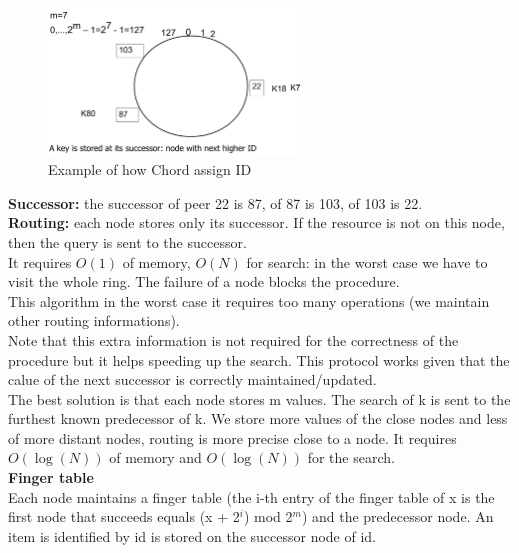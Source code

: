 \documentclass[paper=a4, fontsize=11pt]{scrartcl} %
\numberwithin{equation}{section} %
\numberwithin{figure}{section} %
\numberwithin{table}{section} %
\begin{document}
 \begin{figure}[H]
  \centering
  \includegraphics[width=0.6\textwidth]{img/chord_ex.png}
  \caption{Example of how Chord assign ID}
  \label{fig:boat1}
\end{figure}
\textbf{Successor:} the successor of peer 22 is 87, of 87 is 103, of 103 is 22.\\
\textbf{Routing:} each node stores only its successor. If the resource is not on this node, then the query is sent to the successor.\\
It requires $O(1)$ of memory, $O(N)$ for search: in the worst case we have to visit the whole ring. The failure of a node blocks the procedure.\\
This algorithm in the worst case it requires too many operations (we maintain other routing informations).\\
Note that this extra information is not required for the correctness of the procedure but it helps speeding up the search. This protocol works given that the calue of the next successor is correctly maintained/updated.\\
The best solution is that each node stores m values. The search of k is sent to the furthest known predecessor of k. We store more values of the close nodes and less of more distant nodes, routing is more precise close to a node. It requires $O(\log(N))$ of memory and $O(\log(N))$ for the search.\\
\textbf{Finger table}\\
Each node maintains a finger table (the i-th entry of the finger table of x is the first node that succeeds equals (x + 2$^i$) mod 2$^m$) and the predecessor node. An item is identified by id is stored on the successor node of id.
\end{document}
